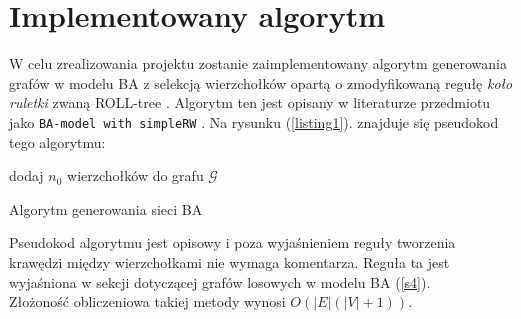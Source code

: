 \documentclass{article}
\begin{document}
\section{Implementowany algorytm \label{s2}}
	W celu zrealizowania projektu zostanie zaimplementowany algorytm generowania grafów w modelu BA z selekcją wierzchołków 
	opartą o zmodyfikowaną regułę \textit{koło ruletki} zwaną ROLL-tree \cite{rolltree} . Algorytm ten jest opisany w literaturze przedmiotu jako \texttt{BA-model with simpleRW} \cite{simpleRW}.
	Na rysunku (\ref{listing1}). znajduje się pseudokod tego algorytmu:\\
	\begin{algorithm}[H]
		dodaj $n_0$ wierzchołków do grafu $\mathcal{G}$ \\
		\label{listing1}
		\caption{Algorytm generowania sieci BA}
	\end{algorithm}
	Pseudokod algorytmu jest opisowy i poza wyjaśnieniem reguły tworzenia krawędzi między
	wierzchołkami nie wymaga komentarza. Reguła ta jest wyjaśniona w sekcji dotyczącej grafów losowych
	w modelu BA (\ref{s4}).\\
	Złożoność obliczeniowa takiej metody wynosi $O(|E|(|V|+1))$. \\
\end{document}
